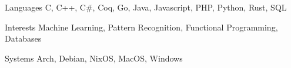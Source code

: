 
\begin{cvskills}
  \cvskill
    {Languages}
    {C, C++, C#, Coq, Go, Java, Javascript, PHP, Python, Rust, SQL}

  \cvskill
    {Interests}
    {Machine Learning, Pattern Recognition, Functional Programming, Databases}

  \cvskill
    {Systems}
    {Arch, Debian, NixOS, MacOS, Windows}
\end{cvskills}
